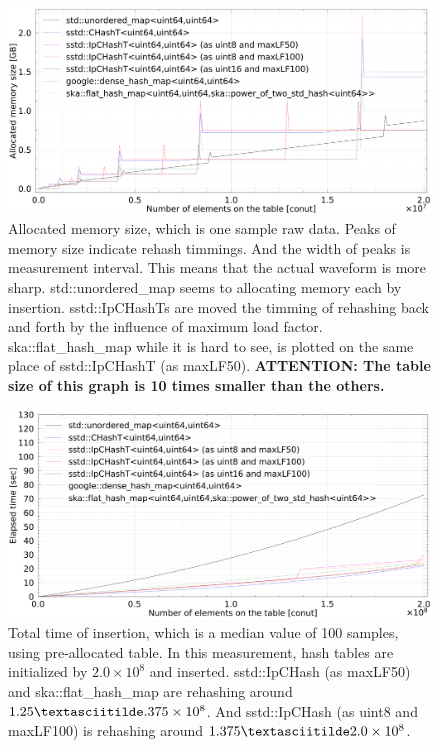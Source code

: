 
\begin{figure}[h]
  \hspace{-1mm}
  \includegraphics[scale=0.24]{./fig_bench/usedMemory.pdf}
  \caption{
    Allocated memory size, which is one sample raw data.
    Peaks of memory size indicate rehash timmings.
    And the width of peaks is measurement interval.
    This means that the actual waveform is more sharp.
    std::unordered\_map seems to allocating memory each by insertion.
    sstd::IpCHashTs are moved the timming of rehashing back and forth by the influence of maximum load factor.
    ska::flat\_hash\_map while it is hard to see, is plotted on the same place of sstd::IpCHashT (as maxLF50).
    {\bf ATTENTION: The table size of this graph is 10 times smaller than the others.}
  }
  \label{fig_bench_memory}
\end{figure}


\begin{figure}[h]
  \includegraphics[scale=0.24]{./fig_bench/insert_et_preAlloc_med.pdf}
  \caption{
    Total time of insertion, which is a median value of 100 samples, using pre-allocated table.
    In this measurement, hash tables are initialized by $2.0\times10^8$ and inserted.
    sstd::IpCHash (as maxLF50) and ska::flat\_hash\_map are rehashing around $1.25\textasciitilde.375\times10^8$.
    And sstd::IpCHash (as uint8 and maxLF100) is rehashing around $1.375\textasciitilde2.0\times10^8$.
  }
  \label{fig_bench_insert_preAlloc}
\end{figure}

